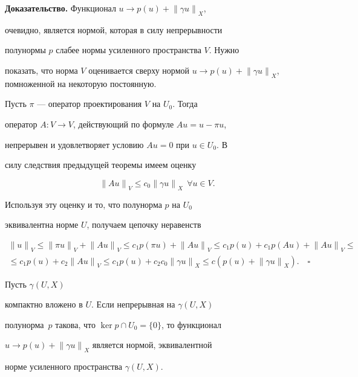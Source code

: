 {\bf Доказательство.} Функционал $u \to p(u)+{\|\gamma u \|}_X$,


очевидно, является нормой, которая в силу непрерывности


полунормы $p$ слабее нормы усиленного пространства $V$. Нужно


показать, что норма $V$ оценивается сверху нормой $u \to


p(u)+{\|\gamma u \|}_X$, помноженной на некоторую постоянную.


Пусть $\pi$ --- оператор проектирования $V$ на $U_0$. Тогда


оператор $A:V \to V$, действующий по формуле $Au=u - \pi u$,


непрерывен и удовлетворяет условию $Au=0$ при $u \in U_0$. В


силу следствия предыдущей теоремы имеем оценку


$$


{\|Au\|}_V \le c_0 {\|\gamma u\|}_X \ \ \forall u \in V.


$$


Используя эту оценку и то, что полунорма $p$ на $U_0$


эквивалентна норме $U$, получаем цепочку неравенств


\begin{multline*}


{\|u\|}_V \le {\|\pi u\|}_V+{\|Au\|}_V \le c_1p(\pi


u)+{\|Au\|}_V \le c_1p(u)+c_1p(Au)+{\|Au\|}_V \le \\


%


\le c_1p(u)+c_2{\|Au\|}_V \le c_1p(u)+c_2c_0{\|\gamma u\|}_X


\le c(p(u)+{\|\gamma u\|}_X).\quad\square


\end{multline*}





\begin{cornonum}


Пусть $\gamma(U,X)$


компактно вложено в $U$. Если непрерывная на $\gamma(U,X)$


полунорма~$p$ такова, что $\ker p \cap U_0 =\{0\}$, то функционал


$u \to p(u)+{\|\gamma u \|}_X$ является нормой, эквивалентной


норме усиленного пространства $\gamma(U,X)$. 


\end{cornonum}





